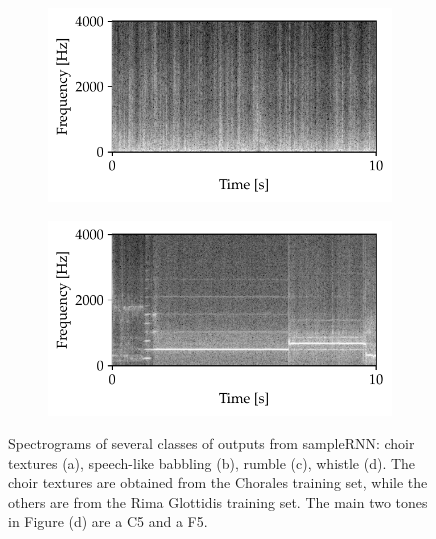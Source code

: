 \begin{figure}[h]
	\begin{subfigure}[b]{0.45\columnwidth}
		\includegraphics[width=\textwidth]{img/rumble.pdf}
		\subcaption{}
	\end{subfigure}	
	\begin{subfigure}[b]{0.45\columnwidth}
		\includegraphics[width=\textwidth]{img/whistle.pdf}
		\subcaption{}
	\end{subfigure}
	
	
	\caption[SampleRNN - Raw Audio Generation]{Spectrograms of several classes of outputs from sampleRNN: choir textures (a), speech-like babbling (b), rumble (c), whistle (d). The choir textures are obtained from the Chorales training set, while the others are from the Rima Glottidis training set. The main two tones in Figure (d) are a C5 and a F5.}
	\label{fig:esempi}
\end{figure}
